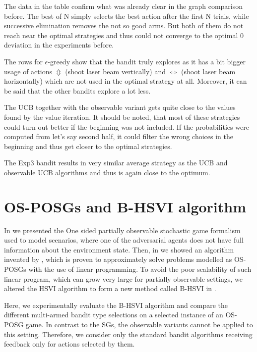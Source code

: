 \documentclass[../main.tex]{subfiles}
\begin{document}
The data in the table confirm what was already clear in the graph comparison before.
The best of N simply selects the best action after the first N trials, while successive elimination removes the not so good arms.
But both of them do not reach near the optimal strategies and thus could not converge to the optimal 0 deviation in the experiments before.

The rows for $\epsilon$-greedy show that the bandit truly explores as it has a bit bigger usage of actions $\Updownarrow$ (shoot laser beam vertically) and $\Leftrightarrow$ (shoot laser beam horizontally) which are not used in the optimal strategy at all.
Moreover, it can be said that the other bandits explore a lot less.

The UCB together with the observable variant gets quite close to the values found by the value iteration.
It should be noted, that most of these strategies could turn out better if the beginning was not included.
If the probabilities were computed from let's say second half, it could filter the wrong choices in the beginning and thus get closer to the optimal strategies.

The Exp3 bandit results in very similar average strategy as the UCB and observable UCB algorithms and thus is again close to the optimum.

\section{OS-POSGs and B-HSVI algorithm}\label{exp:osposg}
In  we presented the One sided partially observable stochastic game formalism used to model scenarios, where one of the adversarial agents does not have full information about the environment state.
Then, in  we showed an algorithm invented by \cite{osposgs}, which is proven to approximately solve problems modelled as OS-POSGs with the use of linear programming.
To avoid the poor scalability of such linear program, which can grow very large for partially observable settings, we altered the HSVI algorithm to form a new method called B-HSVI in .

Here, we experimentally evaluate the B-HSVI algorithm and compare the different multi-armed bandit type selections on a selected instance of an OS-POSG game.
In contrast to the SGs, the observable variants cannot be applied to this setting.
Therefore, we consider only the standard bandit algorithms receiving feedback only for actions selected by them.
\end{document}
